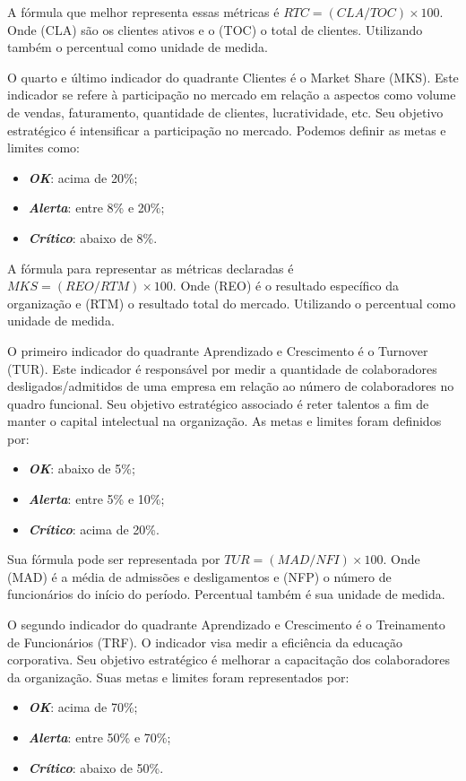 \documentclass[
	12pt,				%
	openright,			%
	oneside,			%
	a4paper,			%
	english,			%
	brazil				%
	]{abntex2}
\begin{document}
A fórmula que melhor representa essas métricas é $RTC = (CLA/TOC) 	\times 100$. Onde (CLA) são os clientes ativos e o (TOC) o total de clientes. Utilizando também o percentual como unidade de medida.

O quarto e último indicador do quadrante Clientes é o Market Share (MKS). Este indicador se refere à participação no mercado em relação a aspectos como volume de vendas, faturamento, quantidade de clientes, lucratividade, etc. Seu objetivo estratégico é intensificar a participação no mercado. Podemos definir as metas e limites como:
\begin{itemize}
\item  \textbf{\textit{OK}}: acima de 20\%;
\item  \textbf{\textit{Alerta}}: entre 8\% e 20\%;
\item  \textbf{\textit{Crítico}}: abaixo de 8\%.
\end{itemize}

A fórmula para representar as métricas declaradas é $MKS = (REO/RTM) \times 100$. Onde (REO) é o resultado específico da organização e (RTM) o resultado total do mercado. Utilizando o percentual como unidade de medida.

O primeiro indicador do quadrante Aprendizado e Crescimento é o Turnover (TUR). Este indicador é responsável por medir a quantidade de colaboradores desligados/admitidos de uma empresa em relação ao número de colaboradores no quadro funcional. Seu objetivo estratégico associado é reter talentos a fim de manter o capital intelectual na organização. As metas e limites foram definidos por:
\begin{itemize}
\item  \textbf{\textit{OK}}: abaixo de 5\%;
\item  \textbf{\textit{Alerta}}: entre 5\% e 10\%;
\item  \textbf{\textit{Crítico}}: acima de 20\%.
\end{itemize}

Sua fórmula pode ser representada por $TUR = (MAD/NFI) 	\times 100$. Onde (MAD) é a média de admissões e desligamentos e (NFP) o número de funcionários do início do período. Percentual também é sua unidade de medida.

O segundo indicador do quadrante Aprendizado e Crescimento é o Treinamento de Funcionários (TRF). O indicador visa medir a eficiência da educação corporativa. Seu objetivo estratégico é melhorar a capacitação dos colaboradores da organização. Suas metas e limites foram representados por:
\begin{itemize}
\item  \textbf{\textit{OK}}: acima de 70\%;
\item  \textbf{\textit{Alerta}}: entre 50\% e 70\%;
\item  \textbf{\textit{Crítico}}: abaixo de 50\%.
\end{itemize}
 
\end{document}
